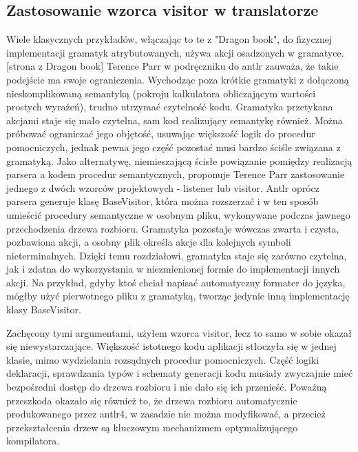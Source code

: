\subsection{Zastosowanie wzorca visitor w translatorze}
Wiele klasycznych przykładów, włączając to te z "Dragon book", do fizycznej implementacji gramatyk atrybutowanych, używa akcji osadzonych w gramatyce.[strona z Dragon book] Terence Parr w podręczniku do antlr\cite{Definitive_antlr_reference} zauważa, że takie podejście ma swoje ograniczenia. Wychodząc poza krótkie gramatyki z dołączoną nieskomplikowaną semantyką (pokroju kalkulatora obliczającym wartości prostych wyrażeń), trudno utrzymać czytelność kodu. Gramatyka przetykana akcjami staje się mało czytelna, sam kod realizujący semantykę również. Można próbować ograniczać jego objętość, usuwając większość logik do procedur pomocniczych, jednak pewna jego część pozostać musi bardzo ściśle związana z gramatyką. Jako alternatywę, niemieszającą ścisłe powiązanie pomiędzy realizacją parsera a kodem procedur semantycznych, proponuje Terence Parr zastosowanie jednego z dwóch wzorców projektowych - listener lub visitor. Antlr oprócz parsera generuje klasę BaseVisitor, która można rozszerzać i w ten sposób umieścić procedury semantyczne w osobnym pliku, wykonywane podczas jawnego przechodzenia drzewa rozbioru. Gramatyka pozostaje wówczas zwarta i czysta, pozbawiona akcji, a osobny plik określa akcje dla kolejnych symboli nieterminalnych. Dzięki temu rozdziałowi, gramatyka staje się zarówno czytelna, jak i zdatna do wykorzystania w niezmienionej formie do implementacji innych akcji. Na przykład, gdyby ktoś chciał napisać automatyczny formater do języka, mógłby użyć pierwotnego pliku z gramatyką, tworząc jedynie inną implementację klasy BaseVisitor.

Zachęcony tymi argumentami, użyłem wzorca visitor, lecz to samo w sobie okazał się niewystarczające. Większość istotnego kodu aplikacji stłoczyła się w jednej klasie, mimo wydzielania rozsądnych procedur pomocniczych. Część logiki deklaracji, sprawdzania typów i schematy generacji kodu musiały zwyczajnie mieć bezpośredni dostęp do drzewa rozbioru i nie dało się ich przenieść. Poważną przeszkoda okazało się również to, że drzewa rozbioru automatycznie produkowanego przez antlr4, w zasadzie nie można modyfikować, a przecież przekształcenia drzew są kluczowym mechanizmem optymalizującego kompilatora.

